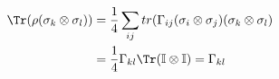 \begin{equation}\label{eqn:proof_gamma}
\begin{split}
 \Tr( \rho (\sigma_k \otimes \sigma_l) ) &= \frac{1}{4}\sum_{ij} tr(\Gamma_{ij} (\sigma_i \otimes \sigma_j)(\sigma_k \otimes \sigma_l)\\
 &=\frac{1}{4} \Gamma_{kl} \Tr (\mathbb{I} \otimes \mathbb{I}) = \Gamma_{kl}
\end{split}
\end{equation}
